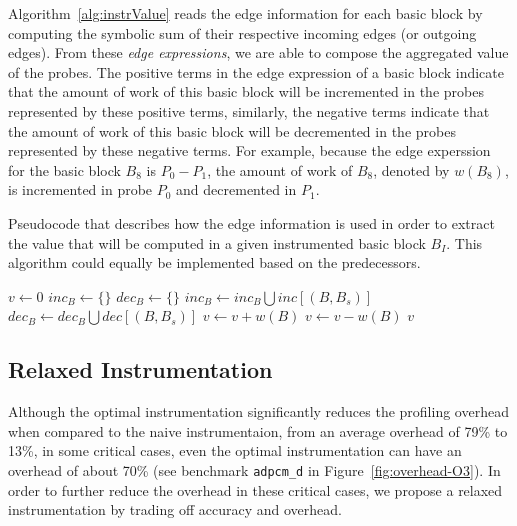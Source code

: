 \documentclass[sigplan,9pt]{acmart}
\begin{document}
Algorithm~\ref{alg:instrValue} reads the edge information for each basic block by computing the symbolic sum of their respective incoming edges (or outgoing edges).
From these \textit{edge expressions}, we are able to compose the aggregated value of the probes.
The positive terms in the edge expression of a basic block indicate that the amount of work of this basic block will be incremented in the probes represented by these positive terms, similarly, the negative terms indicate that the amount of work of this basic block will be decremented in the probes represented by these negative terms.
For example, because the edge experssion for the basic block $B_8$ is $P_0 - P_1$, the amount of work of $B_8$, denoted by $w(B_8)$, is incremented in probe $P_0$ and decremented in $P_1$.

\begin{algorithm}[h]
  \caption{Pseudocode that describes how the edge information is used in order to extract the value that will be computed in a given instrumented basic block $B_I$. This algorithm could equally be implemented based on the predecessors.}
  \label{alg:instrValue}
  \begin{algorithmic}
	\State $v \gets 0$
	   \State $inc_B \gets \{\}$
	   \State $dec_B \gets \{\}$
	      \State $inc_B \gets inc_B \bigcup inc[(B,B_s)]$
	      \State $dec_B \gets dec_B \bigcup dec[(B,B_s)]$
	   \EndFor
	      \State $v \gets v + w(B)$
	   \EndIf
	      \State $v \gets v - w(B)$
	   \EndIf
	\EndFor
    \Return $v$
    \EndFunction
  \end{algorithmic}
\end{algorithm}

\subsection{Relaxed Instrumentation}

Although the optimal instrumentation significantly reduces the profiling overhead when compared to the naive instrumentaion, from an average overhead of 79\% to 13\%, in some critical cases, even the optimal instrumentation can have an overhead of about 70\% (see benchmark \texttt{adpcm\_d} in Figure~\ref{fig:overhead-O3}).
In order to further reduce the overhead in these critical cases, we propose a relaxed instrumentation by trading off accuracy and overhead.
\end{document}
